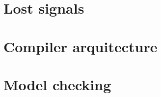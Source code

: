 \documentclass[../Thesis.tex]{subfiles}
\begin{document}
\section{Lost signals}

\section{Compiler arquitecture}

\section{Model checking}
\end{document}
